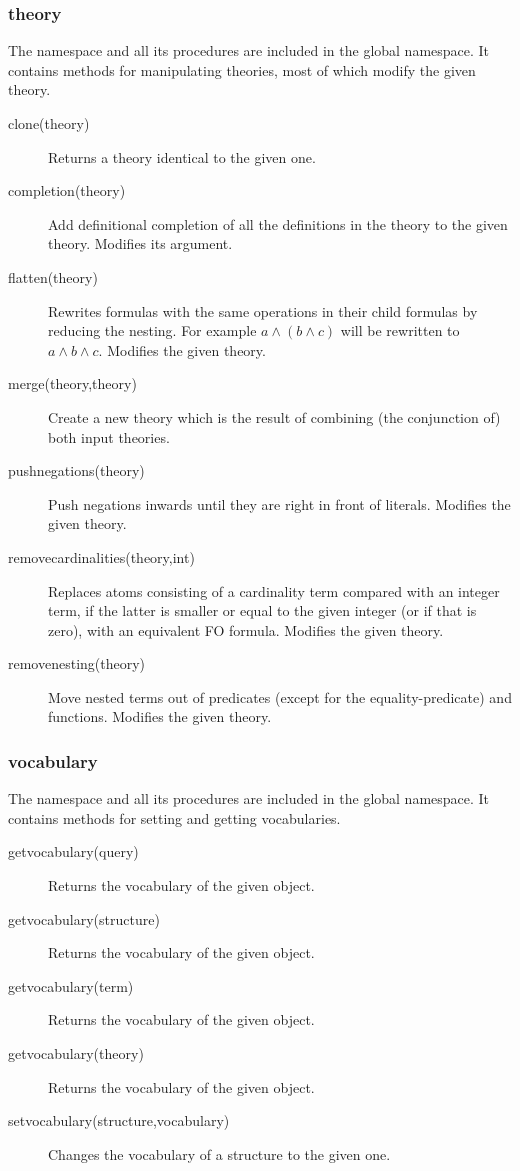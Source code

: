 \subsubsection{theory}
The  namespace and all its procedures are included in the global namespace. It contains methods for manipulating theories, most of which modify the given theory.
\begin{description}
	\item[clone(theory)]
		Returns a theory identical to the given one.
	\item[completion(theory)]
		Add definitional completion of all the definitions in the theory to the given theory. Modifies its argument.
	\item[flatten(theory)]
		Rewrites formulas with the same operations in their child formulas by reducing the nesting. For example $a \wedge (b\wedge c)$ will be rewritten to $a\wedge b \wedge c$.
		Modifies the given theory. 
	\item[merge(theory,theory)]
 		Create a new theory which is the result of combining (the conjunction of) both input theories.
	\item[pushnegations(theory)]
 		Push negations inwards until they are right in front of literals.
 		Modifies the given theory.
	\item[removecardinalities(theory,int)]
		Replaces atoms consisting of a cardinality term compared with an integer term, if the latter is smaller or equal to the given integer (or if that is zero), with an equivalent FO formula.
 		Modifies the given theory.
	\item[removenesting(theory)]
 		Move nested terms out of predicates (except for the equality-predicate) and functions.
 		Modifies the given theory.
\end{description}

\subsubsection{vocabulary}
The  namespace and all its procedures are included in the global namespace. It contains methods for setting and getting vocabularies.
\begin{description}
	\item[getvocabulary(query)]
		Returns the vocabulary of the given object.
	\item[getvocabulary(structure)]
		Returns the vocabulary of the given object.
	\item[getvocabulary(term)]
		Returns the vocabulary of the given object.
	\item[getvocabulary(theory)]
		Returns the vocabulary of the given object.
	\item[setvocabulary(structure,vocabulary)]
		Changes the vocabulary of a structure to the given one.
\end{description}


